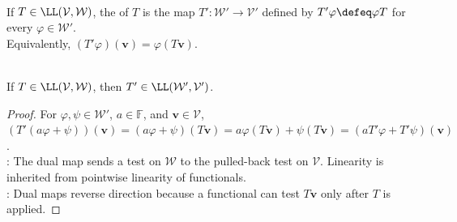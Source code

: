 \begin{definition} \label{def:dual-map} \\
If $T\in\LL(\mathcal{V},\mathcal{W})$, the  of $T$ is the map $T':\mathcal{W}'\to\mathcal{V}'$ defined by $T'\varphi \defeq \varphi T$ for every $\varphi\in\mathcal{W}'$.\\
Equivalently, $(T'\varphi)(\mathbf{v})=\varphi(T\mathbf{v})$.
\end{definition}

\begin{proposition} \label{prop:dual-map-is-linear} \\
If $T\in\LL(\mathcal{V},\mathcal{W})$, then $T'\in\LL(\mathcal{W}',\mathcal{V}')$.
\begin{proof}
For $\varphi,\psi\in\mathcal{W}'$, $a\in\mathbb{F}$, and $\mathbf{v}\in\mathcal{V}$, $\left(T'(a\varphi+\psi)\right)(\mathbf{v}) =(a\varphi+\psi)(T\mathbf{v}) =a\varphi(T\mathbf{v})+\psi(T\mathbf{v}) =\left(aT'\varphi+T'\psi\right)(\mathbf{v})$.\\
: The dual map sends a test on $\mathcal{W}$ to the pulled-back test on $\mathcal{V}$. Linearity is inherited from pointwise linearity of functionals.\\
: Dual maps reverse direction because a functional can test $T\mathbf{v}$ only after $T$ is applied.
\end{proof}
\end{proposition}

